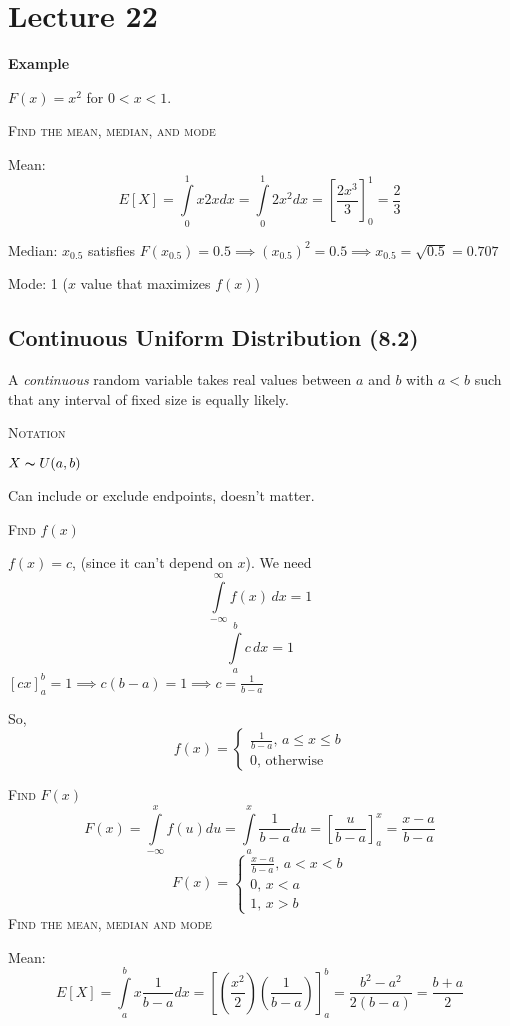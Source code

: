\section{Lecture 22}
\textbf{Example}

$ F(x)=x^2 $ for $ 0<x<1 $.

\textsc{Find the mean, median, and mode}

Mean:
\[ E[X]=\int\limits_{0}^{1} x2x d{x} =\int\limits_{0}^{1} 2x^2 d{x}=
\left[\frac{2x^3}{3}\right]_0^1=\frac{2}{3} \]

Median:
$ x_{0.5} $ satisfies $ F(x_{0.5})=0.5 \implies (x_{0.5})^2=0.5\implies x_{0.5}=
\sqrt{0.5}=0.707$

Mode: 1 ($ x $ value that maximizes $ f(x) $)

\subsection{Continuous Uniform Distribution (8.2)}
A \emph{continuous} random variable takes real values between $ a $ and
$ b $ with $ a<b $ such that any interval of fixed size is equally likely.

\textsc{Notation}

$ X \thicksim U(a,b) $
\begin{remark}
    Can include or exclude endpoints, doesn't matter.
\end{remark}

\textsc{Find $f(x)$}

$ f(x)=c $, (since it can't depend on $ x $). We need
\[ \int\limits_{-\infty}^{\infty} f(x)\,d{x} =1 \]
\[ \int\limits_{a}^{b} c\,d{x} =1 \]
$ \left[cx\right]_a^b=1\implies c(b-a)=1\implies c=\frac{1}{b-a} $

So,
\[ f(x)=\begin{cases}
    \frac{1}{b-a},\, a\le x\le b\\
    0,\, \text{otherwise}
\end{cases} \]

\textsc{Find $ F(x) $}
\[ F(x)=\int\limits_{-\infty}^{x} f(u) d{u}
=\int\limits_{a}^{x} \frac{1}{b-a} d{u}
=\left[\frac{u}{b-a}\right]_a^x=\frac{x-a}{b-a} \]
\[ F(x)=\begin{cases}
    \frac{x-a}{b-a},\, a<x<b\\
    0,\,x<a\\
    1,\,x>b
\end{cases} \]
\textsc{Find the mean, median and mode}

Mean:
\[ E[X]=\int\limits_{a}^{b} x \frac{1}{b-a} d{x}
=\left[\left(\frac{x^2}{2}\right)\left(\frac{1}{b-a}\right)\right]_a^b
=\frac{b^2-a^2}{2(b-a)}=\frac{b+a}{2} \]

